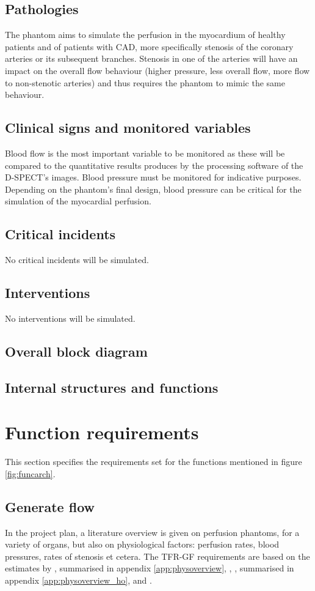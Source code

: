 \subsection{Pathologies}
The phantom aims to simulate the perfusion in the myocardium of healthy patients and of patients with \ac{CAD}, more specifically stenosis of the coronary arteries or its subsequent branches. Stenosis in one of the arteries will have an impact on the overall flow behaviour (higher pressure, less overall flow, more flow to non-stenotic arteries) and thus requires the phantom to mimic the same behaviour.
\subsection{Clinical signs and monitored variables}
Blood flow is the most important variable to be monitored as these will be compared to the quantitative results produces by the processing software of the D-SPECT's images. Blood pressure must be monitored for indicative purposes. Depending on the phantom's final design, blood pressure can be critical for the simulation of the myocardial perfusion.
\subsection{Critical incidents}
No critical incidents will be simulated.
\subsection{Interventions}
No interventions will be simulated.
\subsection{Overall block diagram}

\subsection{Internal structures and functions}
\section{Function requirements}
This section specifies the requirements set for the functions mentioned in figure \ref{fig:funcarch}.
\subsection{Generate flow}
In the project plan, a literature overview is given on perfusion phantoms, for a variety of organs, but also on physiological factors: perfusion rates, blood pressures, rates of stenosis et cetera. The TFR-GF requirements are based on the estimates by \cite{uren1994relation}, summarised in appendix \ref{app:physoverview}, \cite{chiribiri2013normal}, \cite{ho2014dynamic}, summarised in appendix \ref{app:physoverview_ho}, and \cite{slart2015pres}.

